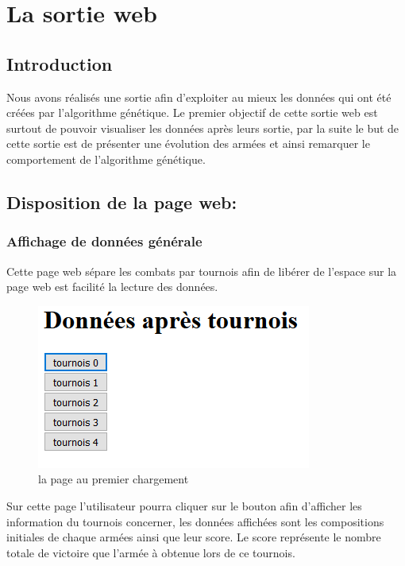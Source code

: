 \documentclass{article}
\begin{document}
\section{La sortie web}

\subsection{Introduction}

	Nous avons réalisés une sortie afin d'exploiter au mieux les données qui ont été créées par l'algorithme génétique. Le premier objectif de cette sortie web est surtout de pouvoir visualiser les données après leurs sortie, par la suite le but de cette sortie est de présenter une évolution des armées et ainsi remarquer le comportement de l'algorithme génétique.

\subsection{Disposition de la page web:}

	\subsubsection{Affichage de données générale}
	
		Cette page web sépare les combats par tournois afin de libérer de l'espace sur la page web est facilité la lecture des données. 
		
		\begin{figure}[h]
			\center
			\includegraphics[scale=1]{../webimg/index.PNG}
			\caption{la page au premier chargement} 
		\end{figure}
		
		Sur cette page l'utilisateur pourra cliquer sur le bouton afin d'afficher les information du tournois concerner, les données affichées sont les compositions initiales de chaque armées ainsi que leur score. Le score représente le nombre totale de victoire que l'armée à obtenue lors de ce tournois.
		
\end{document}
